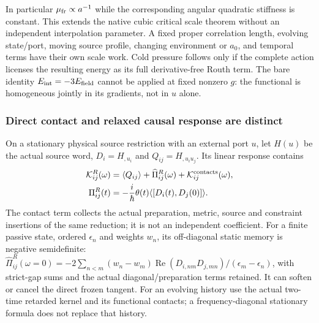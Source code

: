 \documentclass[12pt,a4paper]{article}
\begin{document}
In particular $\mu_{\rm fr}\propto a^{-1}$ while the corresponding angular
quadratic stiffness is constant. This extends the native cubic critical
scale theorem without an independent interpolation parameter. A fixed
proper correlation length, evolving state/port, moving source profile,
changing environment or $a_0$, and temporal terms have their own scale work.
Cold pressure follows only if the complete action licenses the resulting
energy as its full derivative-free Routh term. The bare identity
$E_{\rm int}=-3E_{\rm field}$ cannot be applied at fixed nonzero $g$:
the functional is homogeneous jointly in its gradients, not in $u$ alone.

\subsubsection{Direct contact and relaxed causal response are distinct}
On a stationary physical source restriction with an external port $u$,
let $H(u)$ be the actual source word, $D_i=H_{,u_i}$ and
$Q_{ij}=H_{,u_iu_j}$. Its linear response contains
\begin{equation}
\label{p8:eq:v2209-state-rar-causal-completion}
 \begin{aligned}
 \mathcal K_{ij}^{R}(\omega)
   &=\langle Q_{ij}\rangle+\widehat\Pi_{ij}^{R}(\omega)
                         +\mathcal K_{ij}^{\rm contacts}(\omega),\\
 \Pi_{ij}^{R}(t)&=-\frac{i}{\hbar}\theta(t)
                  \langle[D_i(t),D_j(0)]\rangle .
 \end{aligned}
\end{equation}
The contact term collects the actual preparation, metric, source and
constraint insertions of the same reduction; it is not an independent
coefficient.
For a finite passive state, ordered $\epsilon_n$ and weights $w_n$, its
off-diagonal static memory is negative semidefinite:
$\widehat\Pi_{ij}^{R}(\omega=0)=-2\sum_{n<m}(w_n-w_m)
\operatorname{Re}(D_{i,nm}D_{j,mn})/(\epsilon_m-\epsilon_n)$,
with strict-gap sums and the actual diagonal/preparation terms retained.
It can soften or cancel the direct frozen tangent.
For an evolving history use the actual two-time retarded kernel and its
functional contacts; a frequency-diagonal stationary formula does not
replace that history.
\end{document}
